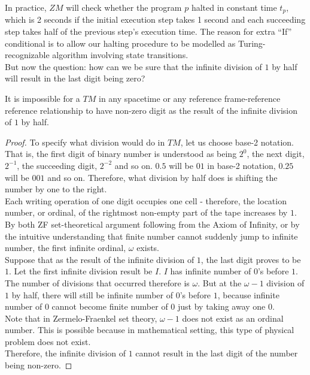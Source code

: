 \documentclass{roffin}
\begin{document}
In practice, $ZM$ will check whether the program $p$ halted in constant time $t_p$, which is 2 seconds if the initial execution step takes 1 second and each succeeding step takes half of the previous step's execution time. The reason for extra ``If'' conditional is to allow our halting procedure to be modelled as Turing-recognizable algorithm involving state transitions.\\
But now the question: how can we be sure that the infinite division of $1$ by half will result in the last digit being zero?\\
\begin{proposition}
It is impossible for a $TM$ in any spacetime or any reference frame-reference reference relationship to have non-zero digit as the result of the infinite division of $1$ by half.
\end{proposition}
\begin{proof}
To specify what division would do in $TM$, let us choose base-2 notation. That is, the first digit of binary number is understood as being $2^0$, the next digit, $2^{-1}$, the succeeding digit, $2^{-2}$ and so on. $0.5$ will be $01$ in base-2 notation, $0.25$ will be $001$ and so on. Therefore, what division by half does is shifting the number by one to the right.\\
Each writing operation of one digit occupies one cell - therefore, the location number, or ordinal, of the rightmost non-empty part of the tape increases by $1$. By both ZF set-theoretical argument following from the Axiom of Infinity, or by the intuitive understanding that finite number cannot suddenly jump to infinite number, the first infinite ordinal, $\omega$ exists.\\
Suppose that as the result of the infinite division of $1$, the last digit proves to be $1$. Let the first infinite division result be $I$. $I$ has infinite number of $0$'s before $1$. The number of divisions that occurred therefore is $\omega$. But at the $\omega - 1$ division of $1$ by half, there will still be infinite number of $0$'s before $1$, because infinite number of $0$ cannot become finite number of $0$ just by taking away one $0$.\\
Note that in Zermelo-Fraenkel set theory, $\omega -1$ does not exist as an ordinal number. This is possible because in mathematical setting, this type of physical problem does not exist.\\
Therefore, the infinite division of $1$ cannot result in the last digit of the number being non-zero.
\end{proof}
\end{document}
